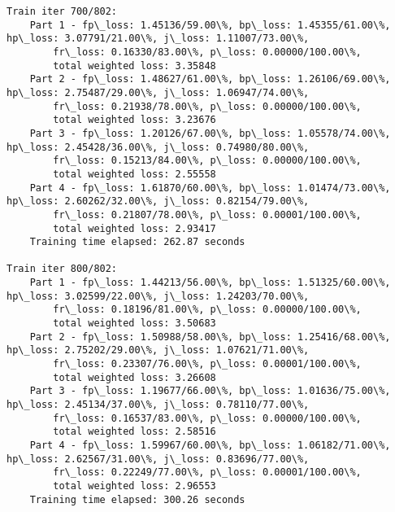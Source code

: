 \documentclass[11pt]{article}
\begin{document}
\begin{Verbatim}[commandchars=\\\{\}]
Train iter 700/802:
	Part 1 - fp\_loss: 1.45136/59.00\%, bp\_loss: 1.45355/61.00\%, hp\_loss: 3.07791/21.00\%, j\_loss: 1.11007/73.00\%, 
		fr\_loss: 0.16330/83.00\%, p\_loss: 0.00000/100.00\%, 
		total weighted loss: 3.35848
	Part 2 - fp\_loss: 1.48627/61.00\%, bp\_loss: 1.26106/69.00\%, hp\_loss: 2.75487/29.00\%, j\_loss: 1.06947/74.00\%, 
		fr\_loss: 0.21938/78.00\%, p\_loss: 0.00000/100.00\%, 
		total weighted loss: 3.23676
	Part 3 - fp\_loss: 1.20126/67.00\%, bp\_loss: 1.05578/74.00\%, hp\_loss: 2.45428/36.00\%, j\_loss: 0.74980/80.00\%, 
		fr\_loss: 0.15213/84.00\%, p\_loss: 0.00000/100.00\%, 
		total weighted loss: 2.55558
	Part 4 - fp\_loss: 1.61870/60.00\%, bp\_loss: 1.01474/73.00\%, hp\_loss: 2.60262/32.00\%, j\_loss: 0.82154/79.00\%, 
		fr\_loss: 0.21807/78.00\%, p\_loss: 0.00001/100.00\%, 
		total weighted loss: 2.93417
	Training time elapsed: 262.87 seconds

Train iter 800/802:
	Part 1 - fp\_loss: 1.44213/56.00\%, bp\_loss: 1.51325/60.00\%, hp\_loss: 3.02599/22.00\%, j\_loss: 1.24203/70.00\%, 
		fr\_loss: 0.18196/81.00\%, p\_loss: 0.00000/100.00\%, 
		total weighted loss: 3.50683
	Part 2 - fp\_loss: 1.50988/58.00\%, bp\_loss: 1.25416/68.00\%, hp\_loss: 2.75202/29.00\%, j\_loss: 1.07621/71.00\%, 
		fr\_loss: 0.23307/76.00\%, p\_loss: 0.00001/100.00\%, 
		total weighted loss: 3.26608
	Part 3 - fp\_loss: 1.19677/66.00\%, bp\_loss: 1.01636/75.00\%, hp\_loss: 2.45134/37.00\%, j\_loss: 0.78110/77.00\%, 
		fr\_loss: 0.16537/83.00\%, p\_loss: 0.00000/100.00\%, 
		total weighted loss: 2.58516
	Part 4 - fp\_loss: 1.59967/60.00\%, bp\_loss: 1.06182/71.00\%, hp\_loss: 2.62567/31.00\%, j\_loss: 0.83696/77.00\%, 
		fr\_loss: 0.22249/77.00\%, p\_loss: 0.00001/100.00\%, 
		total weighted loss: 2.96553
	Training time elapsed: 300.26 seconds


\end{Verbatim}
\end{document}
